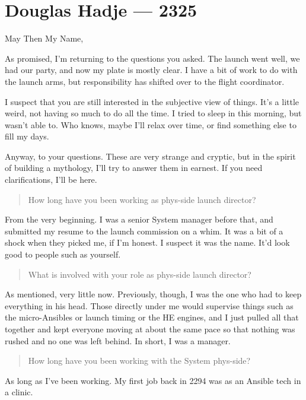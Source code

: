 \hypertarget{douglas-hadje-2325}{%
\chapter{Douglas Hadje — 2325}\label{douglas-hadje-2325}}

May Then My Name,

As promised, I'm returning to the questions you asked. The launch went well, we had our party, and now my plate is mostly clear. I have a bit of work to do with the launch arms, but responsibility has shifted over to the flight coordinator.

I suspect that you are still interested in the subjective view of things. It's a little weird, not having so much to do all the time. I tried to sleep in this morning, but wasn't able to. Who knows, maybe I'll relax over time, or find something else to fill my days.

Anyway, to your questions. These are very strange and cryptic, but in the spirit of building a mythology, I'll try to answer them in earnest. If you need clarifications, I'll be here.

\begin{quote}
How long have you been working as phys-side launch director?
\end{quote}

From the very beginning. I was a senior System manager before that, and submitted my resume to the launch commission on a whim. It was a bit of a shock when they picked me, if I'm honest. I suspect it was the name. It'd look good to people such as yourself.

\begin{quote}
What is involved with your role as phys-side launch director?
\end{quote}

As mentioned, very little now. Previously, though, I was the one who had to keep everything in his head. Those directly under me would supervise things such as the micro-Ansibles or launch timing or the HE engines, and I just pulled all that together and kept everyone moving at about the same pace so that nothing was rushed and no one was left behind. In short, I was a manager.

\begin{quote}
How long have you been working with the System phys-side?
\end{quote}

As long as I've been working. My first job back in 2294 was as an Ansible tech in a clinic.

